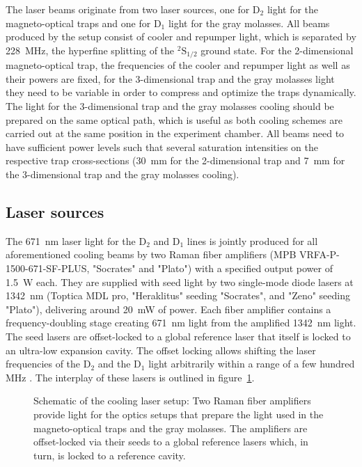 The laser beams originate from two laser sources, one for D$_2$ light for the magneto-optical traps and one for D$_1$ light for the gray molasses. All beams produced by the setup consist of cooler and repumper light, which is separated by \SI{228}{\mega\hertz}, the hyperfine splitting of the $^2\text{S}_{1/2}$ ground state. For the 2-dimensional magneto-optical trap, the frequencies of the cooler and repumper light as well as their powers are fixed, for the 3-dimensional trap and the gray molasses light they need to be variable in order to compress and optimize the traps dynamically. The light for the 3-dimensional trap and the gray molasses cooling should be prepared on the same optical path, which is useful as both cooling schemes are carried out at the same position in the experiment chamber. All beams need to have sufficient power levels such that several saturation intensities on the respective trap cross-sections (\SI{30}{\milli\meter} for the 2-dimensional trap and \SI{7}{\milli\meter} for the 3-dimensional trap and the gray molasses cooling).

\subsection*{Laser sources}
The \SI{671}{\nano\meter} laser light for the D$_2$ and D$_1$ lines is jointly produced for all aforementioned cooling beams by two Raman fiber amplifiers (MPB VRFA-P-1500-671-SF-PLUS, "Socrates" and "Plato") with a specified output power of \SI{1.5}{\watt} each. They are supplied with seed light by two single-mode diode lasers at \SI{1342}{\nano\meter} (Toptica MDL pro, "Heraklitus" seeding "Socrates", and "Zeno" seeding "Plato"), delivering around \SI{20}{\milli\watt} of power. Each fiber amplifier contains a frequency-doubling stage creating \SI{671}{\nano\meter} light from the amplified \SI{1342}{\nano\meter} light. The seed lasers are offset-locked to a global reference laser that itself is locked to an ultra-low expansion cavity. The offset locking allows shifting the laser frequencies of the D$_2$ and the D$_1$ light arbitrarily within a range of a few hundred \si{\mega\hertz} . The interplay of these lasers is outlined in figure~\ref{fig:laser_interplay_schematic}.

\begin{figure}
    \caption{Schematic of the cooling laser setup: Two Raman fiber amplifiers provide light for the optics setups that prepare the light used in the magneto-optical traps and the gray molasses. The amplifiers are offset-locked via their seeds to a global reference lasers which, in turn, is locked to a reference cavity.}\label{fig:laser_interplay_schematic}
\end{figure}


